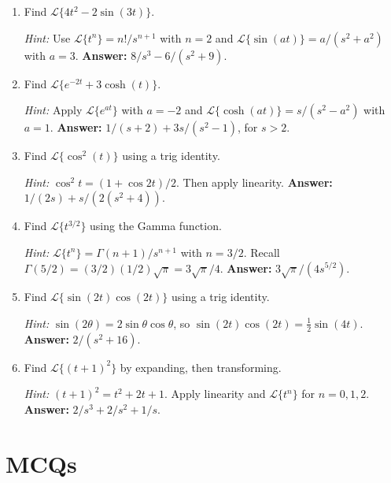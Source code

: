 \documentclass[12pt,a4paper]{article}
\begin{document}
\begin{enumerate}[leftmargin=*, label=\textbf{P\arabic*.}]

\item Find $\mathcal{L}\{4t^2 - 2\sin(3t)\}$.

\textit{Hint:} Use $\mathcal{L}\{t^n\} = n!/s^{n+1}$ with $n=2$ and $\mathcal{L}\{\sin(at)\} = a/(s^2+a^2)$ with $a=3$.
\textbf{Answer:} $8/s^3 - 6/(s^2+9)$.

\item Find $\mathcal{L}\{e^{-2t} + 3\cosh(t)\}$.

\textit{Hint:} Apply $\mathcal{L}\{e^{at}\}$ with $a=-2$ and $\mathcal{L}\{\cosh(at)\} = s/(s^2-a^2)$ with $a=1$.
\textbf{Answer:} $1/(s+2) + 3s/(s^2-1)$, for $s > 2$.

\item Find $\mathcal{L}\{\cos^2(t)\}$ using a trig identity.

\textit{Hint:} $\cos^2 t = (1 + \cos 2t)/2$. Then apply linearity.
\textbf{Answer:} $1/(2s) + s/(2(s^2+4))$.

\item Find $\mathcal{L}\{t^{3/2}\}$ using the Gamma function.

\textit{Hint:} $\mathcal{L}\{t^n\} = \Gamma(n+1)/s^{n+1}$ with $n = 3/2$. Recall $\Gamma(5/2) = (3/2)(1/2)\sqrt{\pi} = 3\sqrt{\pi}/4$.
\textbf{Answer:} $3\sqrt{\pi}/(4s^{5/2})$.

\item Find $\mathcal{L}\{\sin(2t)\cos(2t)\}$ using a trig identity.

\textit{Hint:} $\sin(2\theta) = 2\sin\theta\cos\theta$, so $\sin(2t)\cos(2t) = \tfrac{1}{2}\sin(4t)$.
\textbf{Answer:} $2/(s^2+16)$.

\item Find $\mathcal{L}\{(t+1)^2\}$ by expanding, then transforming.

\textit{Hint:} $(t+1)^2 = t^2 + 2t + 1$. Apply linearity and $\mathcal{L}\{t^n\}$ for $n=0,1,2$.
\textbf{Answer:} $2/s^3 + 2/s^2 + 1/s$.

\end{enumerate}

\section{MCQs}
\end{document}
